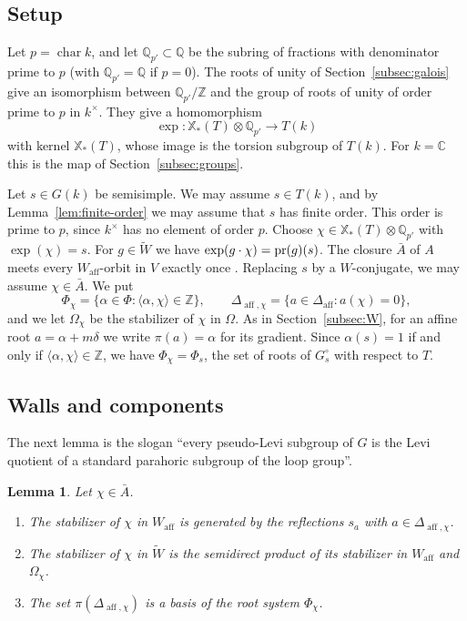 \documentclass[psamsfonts]{amsart}
\newtheorem{lem}[thm]{Lemma}
\theoremstyle{definition}
\theoremstyle{remark}
\numberwithin{equation}{section}
\newcommand{\Z}{\mathbb{Z}}   %
\newcommand{\Q}{\mathbb{Q}}
\newcommand{\X}{\mathbb{X}}
\newcommand{\extw}{\widetilde{W}}
\newcommand{\ra}{\rightarrow}
\DeclareMathOperator{\aff}{aff}
\DeclareMathOperator{\chara}{char}
\newcommand{\CC}{\mathbb{C}}
\numberwithin{equation}{section}
\newcommand{\Om}{\Omega}
\newcommand\Wa{W_{\aff}}
\newcommand\pr{\textup{pr}}
\newcommand{\Daff}{\Delta_{\aff}}
\theoremstyle{plain}
\begin{document}
\subsection{Setup} Let $p=\chara k$, and let $\Q_{p'}\subset\Q$ be the subring of fractions with denominator prime to $p$ (with $\Q_{p'}=\Q$ if $p=0$). The roots of unity of Section~\ref{subsec:galois} give an isomorphism between $\Q_{p'}/\Z$ and the group of roots of unity of order prime to $p$ in $k^\times$. They give a homomorphism
\[
\exp\colon\X_*(T)\otimes\Q_{p'}\ra T(k)
\]
with kernel $\X_*(T)$, whose image is the torsion subgroup of $T(k)$. For $k=\CC$ this is the map of Section~\ref{subsec:groups}.

Let $s\in G(k)$ be semisimple. We may assume $s\in T(k)$, and by Lemma~\ref{lem:finite-order} we may assume that $s$ has finite order. This order is prime to $p$, since $k^\times$ has no element of order $p$. Choose $\chi\in\X_*(T)\otimes\Q_{p'}$ with $\exp(\chi)=s$. For $g\in\extw$ we have $\exp(g\cdot\chi)=\pr(g)(s)$. The closure $\bar A$ of $A$ meets every $\Wa$-orbit in $V$ exactly once \cite[Chapter~V, \S3.3, Theorem~2]{Bou02}. Replacing $s$ by a $W$-conjugate, we may assume $\chi\in\bar A$. We put
\[
\Phi_\chi=\{\alpha\in\Phi:\langle\alpha,\chi\rangle\in\Z\},\qquad \Delta_{\aff,\chi}=\{a\in\Daff:a(\chi)=0\},
\]
and we let $\Om_\chi$ be the stabilizer of $\chi$ in $\Om$. As in Section~\ref{subsec:W}, for an affine root $a=\alpha+m\delta$ we write $\pi(a)=\alpha$ for its gradient. Since $\alpha(s)=1$ if and only if $\langle\alpha,\chi\rangle\in\Z$, we have $\Phi_\chi=\Phi_s$, the set of roots of $G_s^{\circ}$ with respect to $T$.

\subsection{Walls and components}
The next lemma is the slogan ``every pseudo-Levi subgroup of $G$ is the Levi quotient of a standard parahoric subgroup of the loop group''.

\begin{lem}\label{lem:walls}
Let $\chi\in\bar A$.
\begin{enumerate}[(1)]
\item The stabilizer of $\chi$ in $\Wa$ is generated by the reflections $s_a$ with $a\in\Delta_{\aff,\chi}$.
\item The stabilizer of $\chi$ in $\extw$ is the semidirect product of its stabilizer in $\Wa$ and $\Om_\chi$.
\item The set $\pi(\Delta_{\aff,\chi})$ is a basis of the root system $\Phi_\chi$.
\end{enumerate}
\end{lem}
\end{document}
